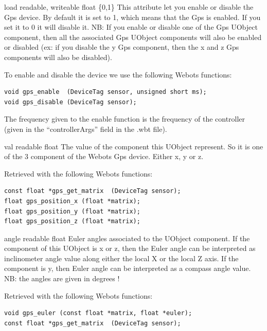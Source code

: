 \noindent
\begin{description}
\begin{attribute}{load}
  {readable, writeable}
  {float}
  {\{0,1\}}
  This attribute let you enable or disable the Gps
  device.  By default it is set to 1, which means that the Gps is
  enabled. If you set it to 0 it will disable it. NB: If you enable or
  disable one of the Gps UObject component, then all the associated
  Gps UObject components will also be enabled or disabled (ex: if you
  disable the y Gps component, then the x and z Gps components will
  also be disabled).


  To enable and disable the device we use the following Webots
  functions:


\begin{lstlisting}
void gps_enable  (DeviceTag sensor, unsigned short ms);
void gps_disable (DeviceTag sensor);
\end{lstlisting}

The frequency given to the enable function is the frequency of the
\urbi controller (given in the ``controllerArgs'' field in the .wbt
file).
\end{attribute}

\begin{attribute}{val}
  {readable}
  {float}
  {}
  The value of the component this UObject represent. So it
 is one of the 3 component of the Webots Gps device. Either x, y or z.


 Retrieved with the following Webots functions:


\begin{lstlisting}
const float *gps_get_matrix  (DeviceTag sensor);
float gps_position_x (float *matrix);
float gps_position_y (float *matrix);
float gps_position_z (float *matrix);
\end{lstlisting}
\end{attribute}

\begin{attribute}{angle}
  {readable}
  {float}
  {}
  Euler angles associated to the UObject component. If the
 component of this UObject is x or z, then the Euler angle can be
 interpreted as inclinometer angle value along either the local X or
 the local Z axis. If the component is y, then Euler angle can be
 interpreted as a compass angle value. NB: the angles are given in
 degrees !


          Retrieved with the following Webots functions:


\begin{lstlisting}
void gps_euler (const float *matrix, float *euler);
const float *gps_get_matrix  (DeviceTag sensor);
\end{lstlisting}
\end{attribute}

\end{description}

